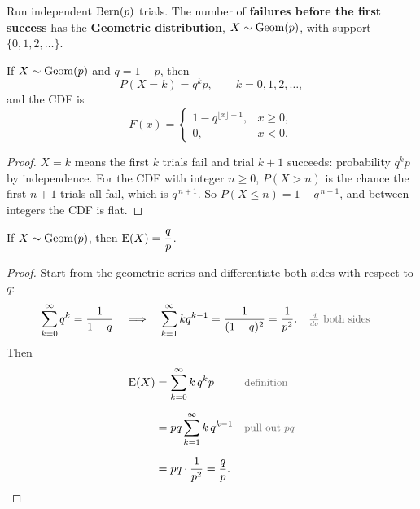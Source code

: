 \bigskip

\begin{story}\label{story:geom}
Run independent $\operatorname{Bern}(p)$ trials. The number of \textbf{failures before the first success} has the \textbf{Geometric distribution}, $X \sim \operatorname{Geom}(p)$, with support $\{0, 1, 2, \dots\}$.
\end{story}

\bigskip

\begin{theorem}\label{thm:geompmf}
If $X \sim \operatorname{Geom}(p)$ and $q = 1 - p$, then
\medskip
\[
P(X = k) = q^{k} p, \qquad k = 0, 1, 2, \dots,
\]
\medskip
and the CDF is
\medskip
\[
F(x) =
\begin{cases}
1 - q^{\lfloor x \rfloor + 1}, & x \ge 0, \\[0.4em]
0, & x < 0.
\end{cases}
\]
\end{theorem}

\medskip

\begin{proof}
$X = k$ means the first $k$ trials fail and trial $k + 1$ succeeds: probability $q^{k}p$ by independence. For the CDF with integer $n \ge 0$, $P(X > n)$ is the chance the first $n + 1$ trials all fail, which is $q^{\,n+1}$. So $P(X \le n) = 1 - q^{\,n+1}$, and between integers the CDF is flat.
\end{proof}

\bigskip

\begin{theorem}\label{thm:geomE}
If $X \sim \operatorname{Geom}(p)$, then $\operatorname{E}(X) = \dfrac{q}{p}$.
\end{theorem}

\medskip

\begin{proof}
Start from the geometric series and differentiate both sides with respect to $q$:
\medskip
\begin{align*}
\sum_{k=0}^{\infty} q^{k} = \frac{1}{1 - q}
\quad &\Longrightarrow \quad
\sum_{k=1}^{\infty} k q^{k-1} = \frac{1}{(1 - q)^{2}} = \frac{1}{p^{2}}.
  && \by{$\tfrac{d}{dq}$ both sides}
\end{align*}
\medskip
Then
\medskip
\begin{align*}
\E(X)
  &= \sum_{k=0}^{\infty} k\, q^{k} p
  && \by{definition} \\[0.6em]
  &= pq \sum_{k=1}^{\infty} k\, q^{k-1}
  && \by{pull out $pq$} \\[0.6em]
  &= pq \cdot \frac{1}{p^{2}}
   = \frac{q}{p}.
\end{align*}
\end{proof}

